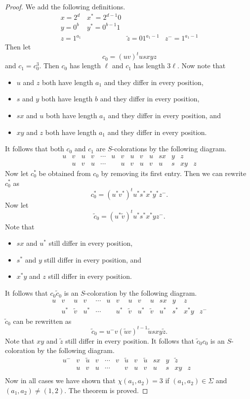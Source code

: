 \documentclass[10pt,a4paper]{amsart}
\begin{document}
\begin{proof}
We add the following definitions.
$$ \begin{array}{llll}
x=2^d & x^*=2^{d-1}0 & & \\
y=0^b & y^*=0^{b-1}1 &  & \\
z=1^{a_1} & & \tilde{z}=01^{a_1-1} & z^-=1^{a_1-1}
\end{array}
$$ 
Then let
$$ c_0=(uv)^tusxyz $$
and $c_1=c_0^3$. Then $c_0$ has length $\ell$ and $c_1$ has length $3\ell$. Now note that
\begin{itemize}
\item $u$ and $z$ both have length $a_1$ and they differ in every position,
\item $s$ and $y$ both have length $b$  and they differ in every position,
\item $sx$ and $u$ both have length $a_1$ and they differ in every position, and
\item $xy$ and $z$ both have length $a_1$ and they differ in every position.
\end{itemize}
It follows that both $c_0$ and $c_1$ are $S$-colorations by the following diagram.
$$  \begin{array}{rcccccccccccccl}
    u & v & u & v & \cdots & u & v & u & v & u & sx &  y & z & \\
    & u & v & u & \cdots & & u& v& u & v& u& s & xy & z     \end{array}
   $$
Now let $c_0^*$ be obtained from $c_0$ by removing its first entry. Then we can rewrite $c_0^*$ as
$$ c_0^*=(u^*v^*)^tu^*s^*x^*y^*z^{-}.$$
Now let
$$ \tilde{c}_0=(u^*\tilde{v})^tu^*s^*x^*yz^{-}. $$
Note that
\begin{itemize}
\item $sx$ and $u^*$ still differ in every position, 
\item $s^*$ and $y$ still differ in every position, and
\item $x^*y$ and $z$ still differ in every position.
\end{itemize}
It follows that $c_0\tilde{c}_0$ is an $S$-coloration by the following diagram.
$$  \begin{array}{rcccccccccccccl}
    u & v & u & v & \cdots & u & v & u & v & u & sx &  y & z & \\
    & u^* & \tilde{v} & u^* & \cdots & & u^*& \tilde{v}& u^* & \tilde{v}& u^*& s^* & x^*y & z^{-}    \end{array}
   $$
$\tilde{c}_0$ can be rewritten as 
   $$ \tilde{c}_0=u^{-}v(\tilde{u}v)^{t-1}\tilde{u}sxy\tilde{z}. $$
   Note that $xy$ and $\tilde{z}$ still differ in every position. It follows that $\tilde{c}_0c_0$ is an $S$-coloration by the following diagram.
   $$  \begin{array}{rcccccccccccccl}
   u^{-} & v & \tilde{u} & v& \cdots & v & \tilde{u} & v &\tilde{u} & sx & y & \tilde{z} \\
   & u & v & u & \cdots &  & v & u & v & u & s &  xy & z & \\
    \end{array}
   $$
Now in all cases we have shown that $\chi(a_1, a_2)=3$ if $(a_1, a_2)\in \Sigma$ and $(a_1, a_2)\neq (1,2)$. The theorem is proved.
\end{proof}
\end{document}
